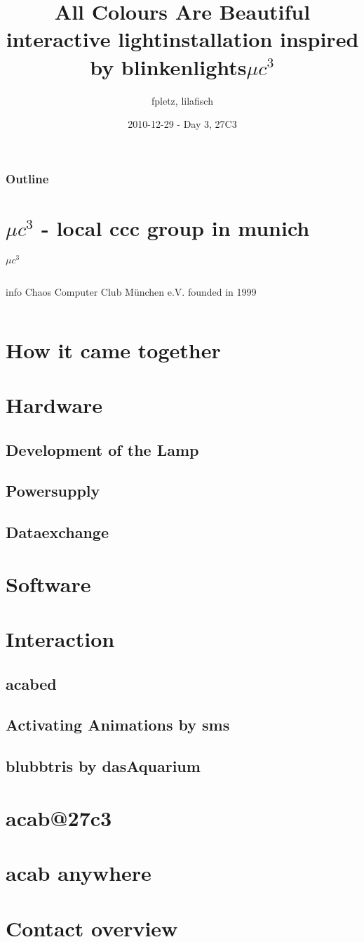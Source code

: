 \documentclass{beamer}
\title[AllColoursAreBeautiful@27c3]{All Colours Are Beautiful\\ interactive lightinstallation inspired by blinkenlights$\mu c^{3}$}
\author{fpletz, lilafisch}
\institute{from $\mu c^{3}$}
\date{2010-12-29 - Day 3, 27C3}
\begin{document}
\begin{frame}
\titlepage
\end{frame}

\begin{frame}
\frametitle{Outline}
\tableofcontents
\end{frame}
\setlength\fboxsep{5pt}
\setlength\fboxrule{0pt}
\section{$\mu c^{3}$ - local ccc group in munich}
    \begin{frame}{$\mu c^{3}$}
    \begin{columns}[T]
    \begin{column}{6cm}
    \begin{block}{info}
       Chaos Computer Club M\"unchen e.V.
       founded in 1999
    \end{block}
    \end{column}
    \end{columns}
    \end{frame}
\section{How it came together}
\section{Hardware}
    \subsection{Development of the Lamp}
    \subsection{Powersupply}
    \subsection{Dataexchange}
\section{Software}
\section{Interaction}
    \subsection{acabed}
    \subsection{Activating Animations by sms}
    \subsection{blubbtris by dasAquarium}
\section{acab@27c3}
\section{acab anywhere}
\section{Contact overview}
\end{document}
